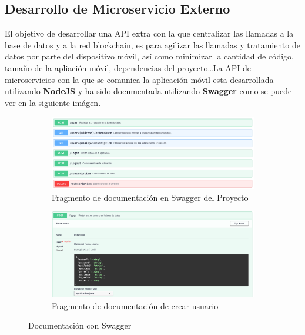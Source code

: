 \subsection{Desarrollo de Microservicio Externo}

El objetivo de desarrollar una API extra con la que centralizar las llamadas a la base de datos y a la red blockchain, es para agilizar las llamadas y tratamiento de datos por parte del dispositivo móvil, así como minimizar la cantidad de código, tamaño de la apliación móvil, dependencias del proyecto\dots La API de microservicios con la que se comunica la aplicación móvil esta desarrollada utilizando \textbf{NodeJS} y ha sido documentada utilizando \textbf{Swagger} como se puede ver en la siguiente imágen.

\begin{figure}[hbt]
	\centering
	\begin{subfigure}[b]{0.4\linewidth}
		\centering
        \includegraphics[width=0.6\linewidth]{figs/Desarrollo/Swagger}
        \caption[Swagger]{Fragmento de documentación en Swagger del Proyecto}
	\end{subfigure} 
	\begin{subfigure}[b]{0.4\linewidth}
		\centering
        \includegraphics[width=0.6\linewidth]{figs/Desarrollo/SwaggerUsuario}
        \caption[Swagger Usuario]{Fragmento de documentación de crear usuario}
	\end{subfigure} 
	\caption[Swagger]{Documentación con Swagger}
	\label{fig:programas}
\end{figure}

